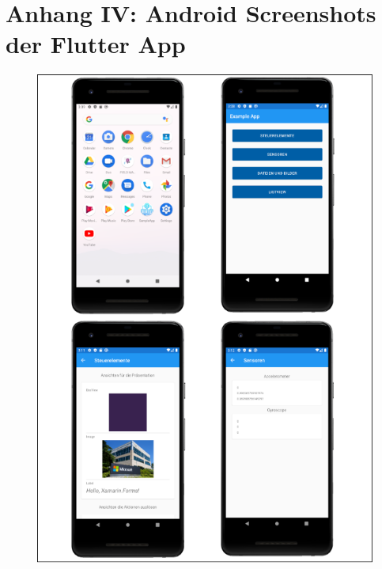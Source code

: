 \chapter{Anhang IV: Android Screenshots der Flutter App}
\label{chap:AnhangAndroidScreenshotsFlutter}


\begin{figure}[ht!]
 \includegraphics[width=\textwidth,keepaspectratio]{Images/Screenshot/AndroidScrenshotI.png}
\end{figure}

